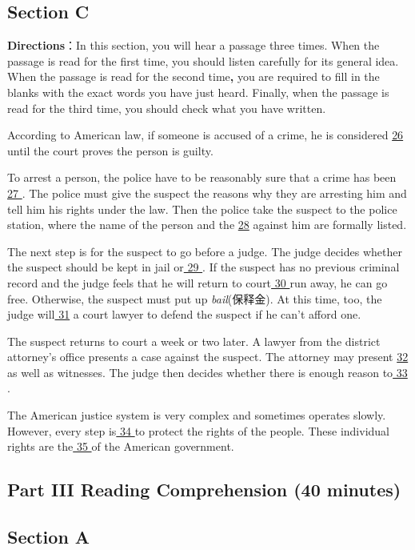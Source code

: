 \documentclass[UTF8,11pt]{ctexart}
\begin{document}
\subsection*{Section C}


\textbf{Directions}：In this section, you will hear a passage three times. When the passage is read for the first time, you should listen carefully for its general idea. When the passage is read for the second time\textbf{,} you are required to fill in the blanks with the exact words you have just heard. Finally, when the passage is read for the third time, you should check what you have written.


According to American law, if someone is accused of a crime, he is considered \uline{26} until the court proves the person is guilty.


To arrest a person, the police have to be reasonably sure that a crime has been \uline{27 }. The police must give the suspect the reasons why they are arresting him and tell him his rights under the law. Then the police take the suspect to the police station, where the name of the person and the \uline{28} against him are formally listed.


The next step is for the suspect to go before a judge. The judge decides whether the suspect should be kept in jail or\uline{ 29 }. If the suspect has no previous criminal record and the judge feels that he will return to court\uline{ 30 }run away, he can go free. Otherwise, the suspect must put up\textit{ bail}(保释金). At this time, too, the judge will\uline{ 31} a court lawyer to defend the suspect if he can’t afford one.


The suspect returns to court a week or two later. A lawyer from the district attorney’s office presents a case against the suspect. The attorney may present \uline{32} as well as witnesses. The judge then decides whether there is enough reason to\uline{ 33 }.


The American justice system is very complex and sometimes operates slowly. However, every step is\uline{ 34 }to protect the rights of the people. These individual rights are the\uline{ 35 }of the American government.


\subsection*{\textbf{Part} III \textbf{Reading Comprehension} \textbf{(40 minutes)}}


\subsection*{Section A}
\end{document}
